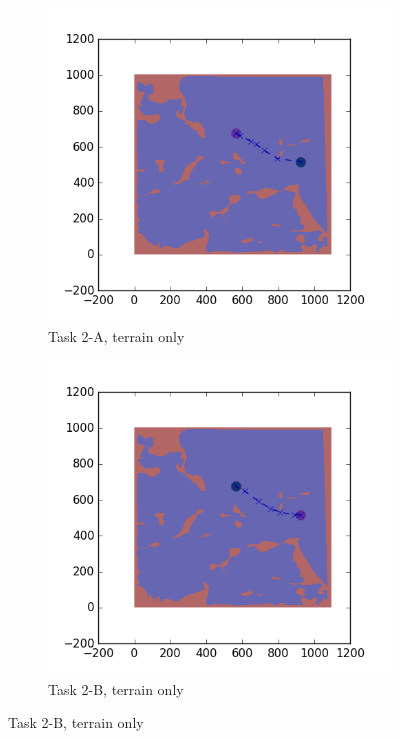 \documentclass{tamuccthesis}
\begin{document}
\begin{figure}
    \centering
    \begin{subfigure}[b]{0.4\textwidth}
        \centering
        \includegraphics[width=\textwidth,trim={4cm 3cm 2cm 3cm},clip]{EXP3RG_PathBa_-1_-1_0_0.png}
        \caption[]{{\small Task 2-A, terrain only}}    
        \label{fig:Path_2-A_terrain}
    \end{subfigure}
    \hfill
    \begin{subfigure}[b]{0.4\textwidth}  
        \centering 
        \includegraphics[width=\textwidth,trim={4cm 3cm 2cm 3cm},clip]{EXP3RG_PathBb_-1_-1_0_0.png}
        \caption[]{{\small Task 2-B, terrain only}}   
        \label{fig:Path_2-B_terrain}
    \end{subfigure}
    

\end{figure}
\end{document}
